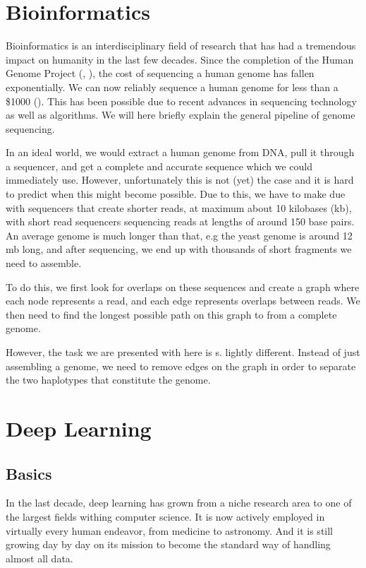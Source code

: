 \documentclass[times, utf8, diplomski, english]{fer_eng}
\begin{document}
\section{Bioinformatics}

Bioinformatics is an interdisciplinary field of research that has had a tremendous impact on humanity in the last few decades. Since the completion of the Human Genome Project (\cite{HGP1}, \cite{HGP2}), the cost of sequencing a human genome has fallen exponentially. We can now reliably sequence a human genome for less than a \$1000 (\cite{genome_cost}). This has been possible due to recent advances in sequencing technology as well as algorithms. We will here briefly explain the general pipeline of genome sequencing.

In an ideal world, we would extract a human genome from DNA, pull it through a sequencer, and get a complete and accurate sequence which we could immediately use. However, unfortunately this is not (yet) the case and it is hard to predict when this might become possible. Due to this, we have to make due with sequencers that create shorter reads, at maximum about 10 kilobases (kb), with short read sequencers sequencing reads at lengths of around 150 base pairs. An average genome is much longer than that, e.g the yeast genome is around 12 mb long, and after sequencing, we end up with thousands of short fragments we need to assemble.

To do this, we first look for overlaps on these sequences and create a graph where each node represents a read, and each edge represents overlaps between reads. We then need to find the longest possible path on this graph to from a complete genome.

However, the task we are presented with here is s. lightly different. Instead of just assembling a genome, we need to remove edges on the graph in order to separate the two haplotypes that constitute the genome.

\section{Deep Learning}

\subsection{Basics}

In the last decade, deep learning has grown from a niche research area to one of the largest fields withing computer science. It is now actively employed in virtually every human endeavor, from medicine to astronomy. And it is still growing day by day on its mission to become the standard way of handling almost all data.
\end{document}
